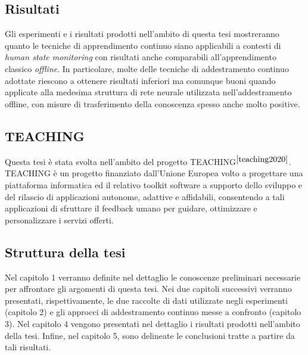 \subsection*{Risultati}
Gli esperimenti e i risultati prodotti nell'ambito di questa tesi mostreranno quanto le tecniche di apprendimento continuo siano applicabili a contesti di \textit{human state monitoring} con risultati anche comparabili all'apprendimento classico \textit{offline}. In particolare, molte delle tecniche di addestramento continuo adottate riescono a ottenere risultati inferiori ma comunque buoni quando applicate alla medesima struttura di rete neurale utilizzata nell'addestramento offline, con misure di trasferimento della conoscenza spesso anche molto positive.

\subsection*{TEACHING}
Questa tesi è stata svolta nell'ambito del progetto TEACHING$^{\cite{teaching2020}}$.\\TEACHING è un progetto finanziato dall'Unione Europea volto a progettare una piattaforma informatica ed il relativo toolkit software a supporto dello sviluppo e del rilascio di applicazioni autonome, adattive e affidabili, consentendo a tali applicazioni di sfruttare il feedback umano per guidare, ottimizzare e personalizzare i servizi offerti.

\subsection*{Struttura della tesi}
Nel capitolo 1 verranno definite nel dettaglio le conoscenze preliminari necessarie per affrontare gli argomenti di questa tesi. Nei due capitoli successivi verranno presentati, rispettivamente, le due raccolte di dati utilizzate negli esperimenti (capitolo 2) e gli approcci di addestramento continuo messe a confronto (capitolo 3).
Nel capitolo 4 vengono presentati nel dettaglio i risultati prodotti nell'ambito della tesi. Infine, nel capitolo 5, sono delineate le conclusioni tratte a partire da tali risultati.
